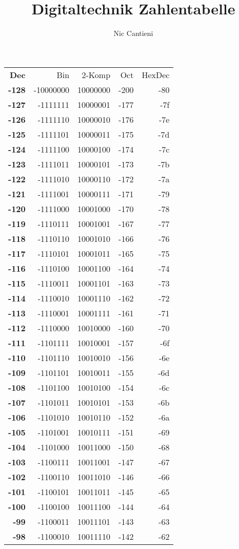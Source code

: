 \documentclass[a4paper]{article}
\begin{document}
\title{Digitaltechnik Zahlentabelle}
\author{Nic Cantieni}
\date{} %

\begin{tabular}{|>{\bfseries}r | r | r | r | r |}

Dec & Bin & 2-Komp & Oct & HexDec \\
-128&-10000000&10000000&-200&-80\\
-127&-1111111&10000001&-177&-7f\\
-126&-1111110&10000010&-176&-7e\\
-125&-1111101&10000011&-175&-7d\\
-124&-1111100&10000100&-174&-7c\\
-123&-1111011&10000101&-173&-7b\\
-122&-1111010&10000110&-172&-7a\\
-121&-1111001&10000111&-171&-79\\
-120&-1111000&10001000&-170&-78\\
-119&-1110111&10001001&-167&-77\\
-118&-1110110&10001010&-166&-76\\
-117&-1110101&10001011&-165&-75\\
-116&-1110100&10001100&-164&-74\\
-115&-1110011&10001101&-163&-73\\
-114&-1110010&10001110&-162&-72\\
-113&-1110001&10001111&-161&-71\\
-112&-1110000&10010000&-160&-70\\
-111&-1101111&10010001&-157&-6f\\
-110&-1101110&10010010&-156&-6e\\
-109&-1101101&10010011&-155&-6d\\
-108&-1101100&10010100&-154&-6c\\
-107&-1101011&10010101&-153&-6b\\
-106&-1101010&10010110&-152&-6a\\
-105&-1101001&10010111&-151&-69\\
-104&-1101000&10011000&-150&-68\\
-103&-1100111&10011001&-147&-67\\
-102&-1100110&10011010&-146&-66\\
-101&-1100101&10011011&-145&-65\\
-100&-1100100&10011100&-144&-64\\
-99&-1100011&10011101&-143&-63\\
-98&-1100010&10011110&-142&-62\\

\end{tabular}
\end{document}
